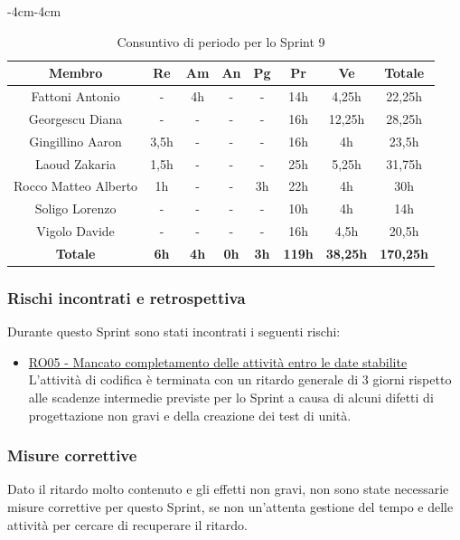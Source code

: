 \documentclass[a4paper,12pt]{article}
\begin{document}
    \begin{table}[H]
    \begin{adjustwidth}{-4cm}{-4cm}
    \centering
    \begin{tabular}{|c|c|c|c|c|c|c|c|}
        \hline
        \textbf{Membro} & \textbf{Re} & \textbf{Am} & \textbf{An} & \textbf{Pg} & \textbf{Pr} & \textbf{Ve} & \textbf{Totale} \\
        \hline
        Fattoni Antonio & - & 4h & - & - & 14h & 4,25h & 22,25h \\
        \hline
        Georgescu Diana & - & - & - & - & 16h & 12,25h & 28,25h \\
        \hline
        Gingillino Aaron & 3,5h & - & - & - & 16h & 4h & 23,5h \\
        \hline
        Laoud Zakaria & 1,5h & - & - & - & 25h & 5,25h & 31,75h \\
        \hline
        Rocco Matteo Alberto & 1h & - & - & 3h & 22h & 4h & 30h \\
        \hline
        Soligo Lorenzo & - & - & - & - & 10h & 4h & 14h \\
        \hline
        Vigolo Davide & - & - & - & - & 16h & 4,5h & 20,5h \\
        \hline
        \textbf{Totale} & \textbf{6h} & \textbf{4h} & \textbf{0h} & \textbf{3h} & \textbf{119h} & \textbf{38,25h} & \textbf{170,25h} \\
        \hline
    \end{tabular}
    \caption{Consuntivo di periodo per lo Sprint 9}
    \end{adjustwidth}
\end{table}

\subsubsection{Rischi incontrati e retrospettiva}
Durante questo Sprint sono stati incontrati i seguenti rischi:
\begin{itemize}
    \item \hyperref[RO05]{RO05 - Mancato completamento delle attività entro le date stabilite} 
    \\L'attività di codifica è terminata con un ritardo generale di 3 giorni rispetto alle scadenze intermedie previste per lo Sprint a causa di alcuni difetti di progettazione non gravi e della creazione dei test di unità.
\end{itemize}

\subsubsection{Misure correttive}
Dato il ritardo molto contenuto e gli effetti non gravi, non sono state necessarie misure correttive per questo Sprint, se non un'attenta gestione del tempo e delle attività per cercare di recuperare il ritardo.
\end{document}
